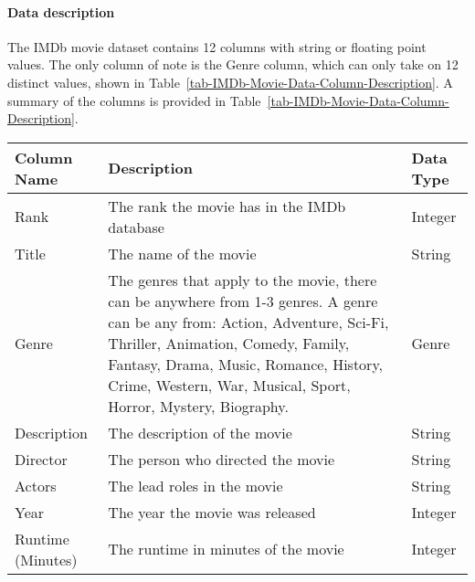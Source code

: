     \paragraph{Data description}
        The IMDb movie dataset contains 12 columns with string or floating point
            values.
        The only column of note is the Genre column, which can only take on 12 distinct
            values, shown in Table~\ref{tab-IMDb-Movie-Data-Column-Description}.
        A summary of the columns is provided in
            Table~\ref{tab-IMDb-Movie-Data-Column-Description}.
        \begin{table}[h]
            \centering
            \begin{tabular}{lp{10cm}l}
                \toprule
                Column Name        & Description                                                                & Data Type \\
                \midrule
                Rank               & The rank the movie has in the IMDb database                                & Integer   \\
                Title              & The name of the movie                                                      & String    \\
                Genre              & The genres that apply to the movie, there can be anywhere from 1-3 genres.
                A genre can be any from: Action, Adventure, Sci-Fi, Thriller, Animation,
                    Comedy, Family, Fantasy, Drama, Music, Romance, History, Crime, Western, War,
                    Musical, Sport, Horror, Mystery, Biography.
                                   & Genre                                                                                  \\
                Description        & The description of the movie                                               & String    \\
                Director           & The person who directed the movie                                          & String    \\
                Actors             & The lead roles in the movie                                                & String    \\
                Year               & The year the movie was released                                            & Integer   \\
                Runtime (Minutes)  & The runtime in minutes of the movie                                        & Integer   \\

\end{tabular}
\end{table}
